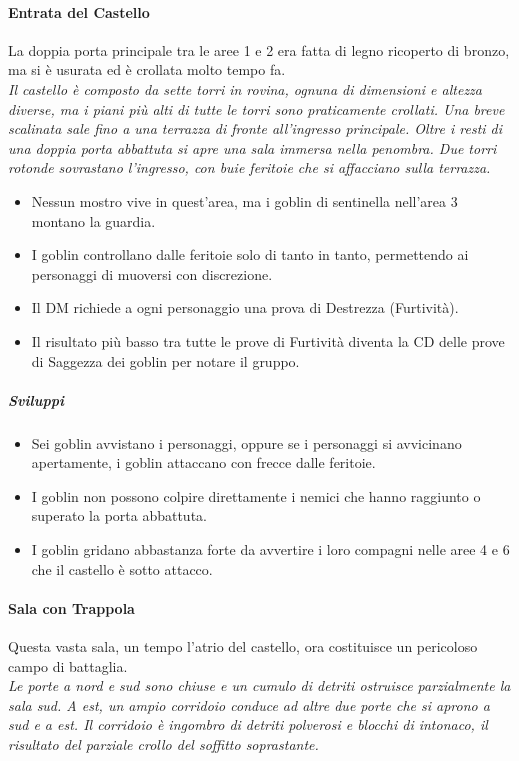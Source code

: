 \documentclass{article}
\begin{document}
\paragraph{Entrata del Castello}
La doppia porta principale tra le aree 1 e 2 era fatta di
legno ricoperto di bronzo, ma si è usurata ed è crollata
molto tempo fa. \\

\textit{Il castello è composto da sette torri in rovina, ognuna di
dimensioni e altezza diverse, ma i piani più alti di tutte le torri
sono praticamente crollati. Una breve scalinata sale fino a
una terrazza di fronte all'ingresso principale. Oltre i resti di
una doppia porta abbattuta si apre una sala immersa nella
penombra. Due torri rotonde sovrastano l'ingresso, con buie
feritoie che si affacciano sulla terrazza.}\\

\begin{itemize}
    \item Nessun mostro vive in quest'area, ma i goblin di sentinella nell’area 3 montano la guardia.
    \item I goblin controllano dalle feritoie solo di tanto in tanto, permettendo ai personaggi di muoversi con discrezione.
    \item Il DM richiede a ogni personaggio una prova di Destrezza (Furtività).
    \item Il risultato più basso tra tutte le prove di Furtività diventa la CD delle prove di Saggezza dei goblin per notare il gruppo.
\end{itemize}

\subparagraph{Sviluppi} \begin{itemize}
    \item Sei goblin avvistano i personaggi, oppure se i personaggi si avvicinano apertamente, i goblin attaccano con frecce dalle feritoie.
    \item I goblin non possono colpire direttamente i nemici che hanno raggiunto o superato la porta abbattuta.
    \item I goblin gridano abbastanza forte da avvertire i loro compagni nelle aree 4 e 6 che il castello è sotto attacco.
\end{itemize}

\paragraph{Sala con Trappola}Questa vasta sala, un tempo l’atrio del castello, ora costituisce
un pericoloso campo di battaglia.\\
\textit{Le porte a nord e sud sono chiuse e un cumulo di detriti
ostruisce parzialmente la sala sud. A est, un ampio corridoio
conduce ad altre due porte che si aprono a sud e a est. Il
corridoio è ingombro di detriti polverosi e blocchi di intonaco,
il risultato del parziale crollo del soffitto soprastante.} \\
\end{document}
